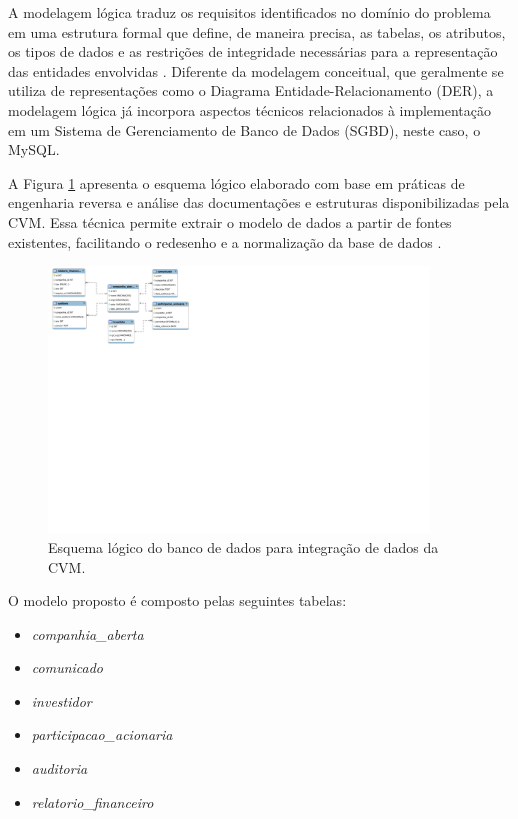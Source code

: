A modelagem lógica traduz os requisitos identificados no domínio do problema em uma estrutura formal que define, de maneira precisa, as tabelas, os atributos, os tipos de dados e as restrições de integridade necessárias para a representação das entidades envolvidas \cite{connolly:2015:database}. Diferente da modelagem conceitual, que geralmente se utiliza de representações como o Diagrama Entidade-Relacionamento (DER), a modelagem lógica já incorpora aspectos técnicos relacionados à implementação em um Sistema de Gerenciamento de Banco de Dados (SGBD), neste caso, o MySQL.

A Figura \ref{fig:esquema_logico} apresenta o esquema lógico elaborado com base em práticas de engenharia reversa e análise das documentações e estruturas disponibilizadas pela CVM. Essa técnica permite extrair o modelo de dados a partir de fontes existentes, facilitando o redesenho e a normalização da base de dados \cite{scannapieco:2006:data}.

\begin{figure}[!htb] 
	\centering
	\caption{Esquema lógico do banco de dados para integração de dados da CVM.} 
	\label{fig:esquema_logico}
	\includegraphics[width=0.9\textwidth]{figuras/esquema_logico.pdf}
	\vspace{1mm}
	\parbox[c]{0.9\textwidth}{\raggedright {}}
\end{figure}

O modelo proposto é composto pelas seguintes tabelas:

\begin{itemize}
	\item \textit{companhia\_aberta}
	\item \textit{comunicado}
	\item \textit{investidor}
	\item \textit{participacao\_acionaria}
	\item \textit{auditoria}
	\item \textit{relatorio\_financeiro}
\end{itemize}

